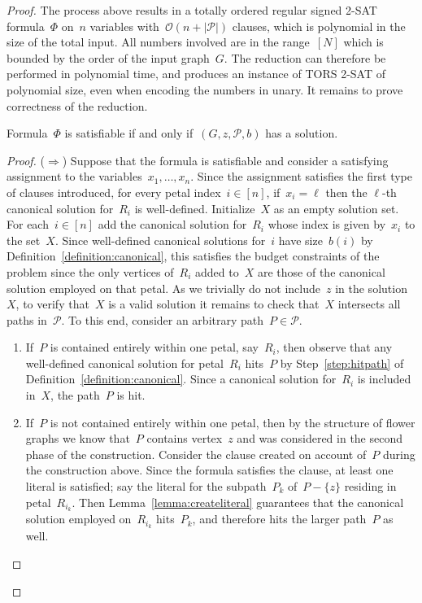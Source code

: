 \let\accentvec\vec  \documentclass{llncs}
\newcommand{\Oh}{{\mathcal{O}}}
\renewcommand{\P}{\ensuremath{\mathcal{P}}\xspace}
\newcommand{\TORSTwoSat}{\textsc{TORS 2-SAT}\xspace}
\begin{document}
\begin{proof}
The process above results in a totally ordered regular signed 2-SAT formula~$\Phi$ on~$n$ variables with~$\Oh(n + |\P|)$ clauses, which is polynomial in the size of the total input. All numbers involved are in the range~$[N]$ which is bounded by the order of the input graph~$G$. The reduction can therefore be performed in polynomial time, and produces an instance of \TORSTwoSat of polynomial size, even when encoding the numbers in unary. It remains to prove correctness of the reduction.

\begin{claim}
Formula~$\Phi$ is satisfiable if and only if~$(G,z,\P,b)$ has a solution.
\end{claim}
\begin{proof}
($\Rightarrow$) Suppose that the formula is satisfiable and consider a satisfying assignment to the variables~$x_1, \ldots, x_n$. Since the assignment satisfies the first type of clauses introduced, for every petal index~$i \in [n]$, if~$x_i = \ell$ then the $\ell$-th canonical solution for~$R_i$ is well-defined. Initialize~$X$ as an empty solution set. For each~$i \in [n]$ add the canonical solution for~$R_i$ whose index is given by~$x_i$ to the set~$X$. Since well-defined canonical solutions for~$i$ have size~$b(i)$ by Definition~\ref{definition:canonical}, this satisfies the budget constraints of the problem since the only vertices of~$R_i$ added to~$X$ are those of the canonical solution employed on that petal. As we trivially do not include~$z$ in the solution~$X$, to verify that~$X$ is a valid solution it remains to check that~$X$ intersects all paths in~$\P$. To this end, consider an arbitrary path~$P \in \P$.

\begin{enumerate}
	\item If~$P$ is contained entirely within one petal, say~$R_i$, then observe that any well-defined canonical solution for petal~$R_i$ hits~$P$ by Step~\ref{step:hitpath} of Definition~\ref{definition:canonical}. Since a canonical solution for~$R_i$ is included in~$X$, the path~$P$ is hit.
	\item If~$P$ is not contained entirely within one petal, then by the structure of flower graphs we know that~$P$ contains vertex~$z$ and was considered in the second phase of the construction. Consider the clause created on account of~$P$ during the construction above. Since the formula satisfies the clause, at least one literal is satisfied; say the literal for the subpath~$P_k$ of~$P - \{z\}$ residing in petal~$R_{i_k}$. Then Lemma~\ref{lemma:createliteral} guarantees that the canonical solution employed on~$R_{i_k}$ hits~$P_k$, and therefore hits the larger path~$P$ as well.
\end{enumerate}


\end{proof}
\end{proof}
\end{document}
